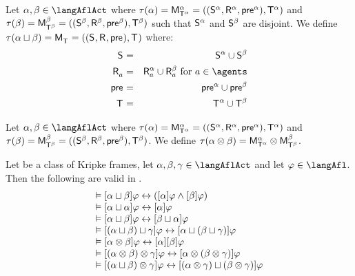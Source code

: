 \begin{definition}\label{afl-choice}
Let $\alpha, \beta \in \langAflAct$ where $\tau(\alpha) = \aPModel[\alpha]{\aStatesT[\alpha]} = \aPModelTuple[\alpha]{\aStatesT[\alpha]}$ and $\tau(\beta) = \aPModel[\beta]{\aStatesT[\beta]} = \aPModelTuple[\beta]{\aStatesT[\beta]}$ such that $\aStates[\alpha]$ and $\aStates[\beta]$ are disjoint.
We define $\tau(\alpha \choice \beta) = \aPModel{\aStatesT} = \aPModelTuple{\aStatesT}$ where:
\begin{eqnarray*}
    \aStates &=& \aStates[\alpha] \cup \aStates[\beta]\\
    \aAccessibility{\agentA} &=& \aAccessibility[\alpha]{\agentA} \cup \aAccessibility[\beta]{\agentA} \text{ for } \agentA \in \agents\\
    \aPrecondition &=& \aPrecondition[\alpha] \cup \aPrecondition[\beta]\\
    \aStatesT &=& \aStatesT[\alpha] \cup \aStatesT[\beta]
\end{eqnarray*}
\end{definition}

\begin{definition}\label{afl-sequential}
Let $\alpha, \beta \in \langAflAct$ where $\tau(\alpha) = \aPModel[\alpha]{\aStatesT[\alpha]} = \aPModelTuple[\alpha]{\aStatesT[\alpha]}$ and $\tau(\beta) = \aPModel[\beta]{\aStatesT[\beta]} = \aPModelTuple[\beta]{\aStatesT[\beta]}$.
We define $\tau(\alpha \compose \beta) = \aPModel[\alpha]{\aStatesT[\alpha]} \exec \aPModel[\beta]{\aStatesT[\beta]}$.
\end{definition}

\begin{lemma}\label{afl-choice-sequential-validities}
Let \classC{} be a class of Kripke frames, let $\alpha, \beta, \gamma \in \langAflAct$ and let $\phi \in \langAfl$. Then the following are valid in \logicAflC{}.
$$
\begin{array}{l}
    \entails \actionA{\alpha \choice \beta} \phi \iff (\actionA{\alpha} \phi \land \actionA{\beta} \phi) \label{afl-axiom-choice}\\
    \entails \actionA{\alpha \choice \alpha} \phi \iff \actionA{\alpha} \phi\\
    \entails \actionA{\alpha \choice \beta} \phi \iff \actionA{\beta \choice \alpha} \phi\\
    \entails \actionA{(\alpha \choice \beta) \choice \gamma} \phi \iff \actionA{\alpha \choice (\beta \choice \gamma)} \phi\\
    \entails \actionA{\alpha \compose \beta} \phi \iff \actionA{\alpha} \actionA{\beta} \phi \label{afl-axiom-sequential}\\
    \entails \actionA{(\alpha \compose \beta) \compose \gamma} \phi \iff \actionA{\alpha \compose (\beta \compose \gamma)} \phi\\
    \entails \actionA{(\alpha \choice \beta) \compose \gamma} \phi \iff \actionA{(\alpha \compose \gamma) \choice (\beta \compose \gamma)} \phi
\end{array}
$$
\end{lemma}

